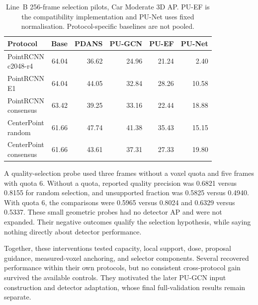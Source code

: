 \begin{table}[!t]\centering\setlength{\tabcolsep}{4pt}
\begin{tabular}{lrrrrr}\toprule
Protocol & Base & PDANS & PU-GCN & PU-EF & PU-Net\\\midrule
\shortstack[l]{PointRCNN\\c2048-r4} & 64.04 & 36.62 & 24.96 & 21.24 & 2.40\\
\shortstack[l]{PointRCNN\\E1} & 64.04 & 44.05 & 32.84 & 28.26 & 10.58\\
\shortstack[l]{PointRCNN\\consensus} & 63.42 & 39.25 & 33.16 & 22.44 & 18.88\\
\shortstack[l]{CenterPoint\\random} & 61.66 & 47.74 & 41.38 & 35.43 & 15.15\\
\shortstack[l]{CenterPoint\\consensus} & 61.66 & 43.61 & 37.31 & 27.33 & 19.80\\
\bottomrule\end{tabular}
\caption{Line~B 256-frame selection pilots, Car Moderate 3D AP. PU-EF is the compatibility implementation and PU-Net uses fixed normalisation. Protocol-specific baselines are not pooled.}\label{tab:k-lineb-selectors}\end{table}

A quality-selection probe used three frames without a voxel quota
and five frames with quota 6. Without a quota, reported quality
precision was 0.6821 versus 0.8155 for random selection, and unsupported
fraction was 0.5825 versus 0.4940. With quota 6, the comparisons
were 0.5965 versus 0.8024 and 0.6329 versus 0.5337.
These small geometric probes had no detector AP and were not expanded.
Their negative outcomes qualify the selection hypothesis, while saying
nothing directly about detector performance.

Together, these interventions tested capacity, local support, dose,
proposal guidance, measured-voxel anchoring, and selector components.
Several recovered performance within their own protocols, but no
consistent cross-protocol gain survived the available controls.
They motivated the later PU-GCN input construction and detector
adaptation, whose final full-validation results remain separate.
